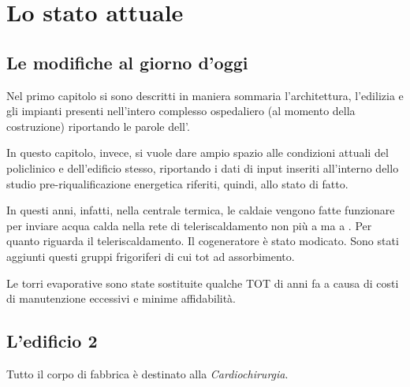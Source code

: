 \chapter{Lo stato attuale}
\thispagestyle{empty}
\section{Le modifiche al giorno d'oggi}
Nel primo capitolo si sono descritti in maniera sommaria l'architettura, l'edilizia e gli impianti presenti nell'intero complesso ospedaliero (al momento della costruzione) riportando le parole dell'. 

In questo capitolo, invece, si vuole dare ampio spazio alle condizioni attuali del policlinico e dell'edificio stesso, riportando i dati di input inseriti all'interno dello studio pre-riqualificazione energetica riferiti, quindi, allo stato di fatto. 

In questi anni, infatti, nella centrale termica, le caldaie vengono fatte funzionare per inviare acqua calda nella rete di teleriscaldamento non più a  ma a . Per quanto riguarda il teleriscaldamento.
Il cogeneratore è stato modicato. Sono stati aggiunti questi gruppi frigoriferi di cui tot ad assorbimento.

Le torri evaporative sono state sostituite qualche TOT di anni fa a causa di costi di manutenzione eccessivi e minime affidabilità.
\clearpage
\section{L'edificio 2}
Tutto il corpo di fabbrica è destinato alla \emph{Cardiochirurgia}.

